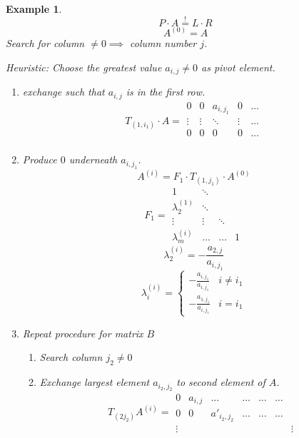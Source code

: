\documentclass[a4paper,landscape,twocolumn]{article}
\newtheorem{ex}{Example}[section]
\begin{document}
\begin{ex}
  \label{ex-6.49}
  \[ P \cdot A \overset{!}{=} L \cdot R \]
  \[ A^{(0)} = A \]
  Search for column $\neq 0 \implies$ column number $j$.

  Heuristic: Choose the greatest value $a_{i,j} \neq 0$ as pivot element.
  \begin{enumerate}
    \item exchange such that $a_{i,j}$ is in the first row.
      \[
        T_{(1,i_1)} \cdot A = \begin{matrix}
          0 & 0 & a_{i,j_1} & 0 & \ldots \\
          \vdots & \vdots & \ddots & \vdots & \ldots \\
          0 & 0 & 0 & 0 & \ldots \\
        \end{matrix}
      \]
    \item Produce $0$ underneath $a_{i,j_1}$.
      \[ A^{(i)} = F_1 \cdot T_{(1,j_1)} \cdot A^{(0)} \]
      \[
        F_1 = \begin{matrix}
          1 & \ddots &   &   \\
          \lambda_2^{(1)} & \ddots & & \\
          \vdots & \vdots & \ddots & \\
          \lambda_m^{(i)} & \ldots & \ldots & 1
        \end{matrix}
      \]
      \[ \lambda_2^{(i)} = -\frac{a_{2,j}}{a_{i,j_1}} \]
      \[
        \lambda_i^{(i)} = \begin{cases}
          -\frac{a_{i,j_1}}{a_{i,j_1}} & i \neq i_1 \\
          -\frac{a_{1,j_1}}{a_{i,j_1}} & i = i_1
        \end{cases}
      \]
    \item Repeat procedure for matrix $B$
      \begin{enumerate}
        \item Search column $j_2 \neq 0$
        \item Exchange largest element $a_{i_2, j_2}$ to second element of $A$.
          \[
            T_{(2 j_2)} A^{(i)} =
            \begin{matrix}
              0 & a_{i,j} & \ldots & \ldots & \ldots & \ldots \\
              0 & 0 & a'_{i_2,j_2} & \ldots & \ldots & \ldots \\
              \vdots &  & & & & & \vdots
            \end{matrix}
          \] \[
\]
\end{enumerate}
\end{enumerate}
\end{ex}
\end{document}
